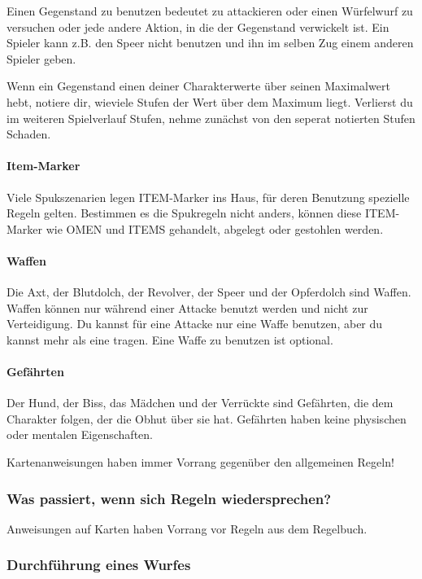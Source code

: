Einen Gegenstand zu benutzen bedeutet zu attackieren oder einen Würfelwurf zu versuchen oder jede andere Aktion, in die der Gegenstand verwickelt ist. Ein Spieler kann z.B. den Speer nicht benutzen und ihn im selben Zug einem anderen Spieler geben.

Wenn ein Gegenstand einen deiner Charakterwerte über seinen Maximalwert hebt, notiere dir, wieviele Stufen der Wert über dem Maximum liegt. Verlierst du im weiteren Spielverlauf Stufen, nehme zunächst von den seperat notierten Stufen Schaden.

\paragraph{Item-Marker}

Viele Spukszenarien legen ITEM-Marker ins Haus, für deren Benutzung spezielle Regeln gelten. Bestimmen es die Spukregeln nicht anders, können diese ITEM-Marker wie OMEN und ITEMS gehandelt, abgelegt oder gestohlen werden.

\paragraph{Waffen} Die Axt, der Blutdolch, der Revolver, der Speer und der Opferdolch sind Waffen. Waffen können nur während einer Attacke benutzt werden und nicht zur Verteidigung. Du kannst für eine Attacke nur eine Waffe benutzen, aber du kannst mehr als eine tragen. Eine Waffe zu benutzen ist optional.

\paragraph{Gefährten}
Der Hund, der Biss, das Mädchen und der Verrückte sind Gefährten, die dem Charakter folgen, der die Obhut über sie hat. Gefährten haben keine physischen oder mentalen Eigenschaften.

Kartenanweisungen haben immer Vorrang gegenüber den allgemeinen Regeln!

\subsubsection{Was passiert, wenn sich Regeln wiedersprechen?}

Anweisungen auf Karten haben Vorrang vor Regeln aus dem Regelbuch.

\subsubsection{Durchführung eines Wurfes}

